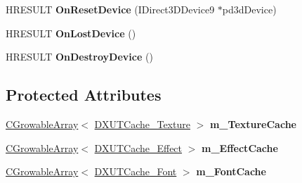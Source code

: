 \begin{DoxyCompactItemize}
\item 
\hypertarget{class_c_d_x_u_t_resource_cache_a10f3f5f8c73a0c64cb64e9647a1e3735}{H\+R\+E\+S\+U\+L\+T {\bfseries On\+Reset\+Device} (I\+Direct3\+D\+Device9 $\ast$pd3d\+Device)}\label{class_c_d_x_u_t_resource_cache_a10f3f5f8c73a0c64cb64e9647a1e3735}

\item 
\hypertarget{class_c_d_x_u_t_resource_cache_abaf5192e33946915a9d1a3098ffdd17a}{H\+R\+E\+S\+U\+L\+T {\bfseries On\+Lost\+Device} ()}\label{class_c_d_x_u_t_resource_cache_abaf5192e33946915a9d1a3098ffdd17a}

\item 
\hypertarget{class_c_d_x_u_t_resource_cache_ac91b24c21474e187e21099c72583946e}{H\+R\+E\+S\+U\+L\+T {\bfseries On\+Destroy\+Device} ()}\label{class_c_d_x_u_t_resource_cache_ac91b24c21474e187e21099c72583946e}

\end{DoxyCompactItemize}
\subsection*{Protected Attributes}
\begin{DoxyCompactItemize}
\item 
\hypertarget{class_c_d_x_u_t_resource_cache_aed21a9ccd938157cdcfd0a856c549692}{\hyperlink{class_c_growable_array}{C\+Growable\+Array}$<$ \hyperlink{struct_d_x_u_t_cache___texture}{D\+X\+U\+T\+Cache\+\_\+\+Texture} $>$ {\bfseries m\+\_\+\+Texture\+Cache}}\label{class_c_d_x_u_t_resource_cache_aed21a9ccd938157cdcfd0a856c549692}

\item 
\hypertarget{class_c_d_x_u_t_resource_cache_a7342b42774d0ec8ce06f349c5fd530a8}{\hyperlink{class_c_growable_array}{C\+Growable\+Array}$<$ \hyperlink{struct_d_x_u_t_cache___effect}{D\+X\+U\+T\+Cache\+\_\+\+Effect} $>$ {\bfseries m\+\_\+\+Effect\+Cache}}\label{class_c_d_x_u_t_resource_cache_a7342b42774d0ec8ce06f349c5fd530a8}

\item 
\hypertarget{class_c_d_x_u_t_resource_cache_a475cc05a7fd8f3012f8a96f1a9c720e2}{\hyperlink{class_c_growable_array}{C\+Growable\+Array}$<$ \hyperlink{struct_d_x_u_t_cache___font}{D\+X\+U\+T\+Cache\+\_\+\+Font} $>$ {\bfseries m\+\_\+\+Font\+Cache}}\label{class_c_d_x_u_t_resource_cache_a475cc05a7fd8f3012f8a96f1a9c720e2}

\end{DoxyCompactItemize}
